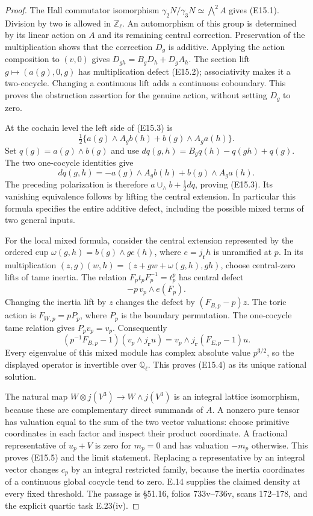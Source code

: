 \documentclass[11pt,oneside]{article}
\begin{document}
\begin{proof}
The Hall commutator isomorphism
$\gamma_2N/\gamma_3N\simeq\bigwedge^2A$ gives (E15.1).
Division by two is allowed in $\mathbb Z_\ell$.
An automorphism of this group is determined by its
linear action on $A$ and its remaining central correction.
Preservation of the multiplication shows that the
correction $D_g$ is additive. Applying the action
composition to $(v,0)$ gives
$D_{gh}=B_gD_h+D_gA_h$.
The section lift $g\mapsto(a(g),0,g)$ has multiplication
defect (E15.2); associativity makes it a two-cocycle.
Changing a continuous lift adds a continuous coboundary.
This proves the obstruction assertion for the genuine
action, without setting $D_g$ to zero.

At the cochain level the left side of (E15.3) is
\[
 \tfrac12\{a(g)\wedge A_gb(h)+b(g)\wedge A_ga(h)\}.
\]
Set $q(g)=a(g)\wedge b(g)$ and use
$dq(g,h)=B_gq(h)-q(gh)+q(g)$. The two one-cocycle
identities give
\[
 dq(g,h)=-a(g)\wedge A_gb(h)+b(g)\wedge A_ga(h).
\]
The preceding polarization is therefore
$a\cup_\wedge b+\tfrac12dq$, proving (E15.3).
Its vanishing equivalence follows by lifting the
central extension. In particular this formula
specifies the entire additive defect, including
the possible mixed terms of two general inputs.

For the local mixed formula, consider the central
extension represented by the ordered cup
$\omega(g,h)=b(g)\wedge g e(h)$, where
$e=j_{\mathbf r}h$ is unramified at $p$.
In its multiplication
$(z,g)(w,h)=(z+gw+\omega(g,h),gh)$, choose central-zero
lifts of tame inertia. The relation
$F_pt_pF_p^{-1}=t_p^p$ has central defect
\[
 -p\,v_p\wedge e(F_p).
\]
Changing the inertia lift by $z$ changes the defect by
$(F_{B,p}-p)z$. The toric action is $F_{W,p}=pP_p$,
where $P_p$ is the boundary permutation. The
one-cocycle tame relation gives $P_pv_p=v_p$.
Consequently
\[
 (p^{-1}F_{B,p}-1)
       (v_p\wedge j_{\mathbf r}u)
   =v_p\wedge j_{\mathbf r}(F_{E,p}-1)u.
\]
Every eigenvalue of this mixed module has complex
absolute value $p^{3/2}$, so the displayed operator
is invertible over $\mathbb Q_\ell$. This proves
(E15.4) as its unique rational solution.

The natural map $W\otimes j(V^3)\to W\wedge j(V^3)$
is an integral lattice isomorphism, because these
are complementary direct summands of $A$.
A nonzero pure tensor has valuation equal to the
sum of the two vector valuations: choose primitive
coordinates in each factor and inspect their
product coordinate. A fractional representative of
$u_p+V$ is zero for $m_p=0$ and has valuation $-m_p$
otherwise. This proves (E15.5) and the limit statement.
Replacing a representative by an integral vector
changes $c_p$ by an integral restricted family,
because the inertia coordinates of a continuous
global cocycle tend to zero. E.14 supplies the
claimed density at every fixed threshold.
The passage is \S51.16, folios 733v--736v,
scans 172--178, and the explicit quartic task E.23(iv).
\end{proof}
\end{document}
